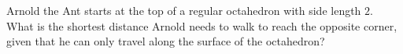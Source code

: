 Arnold the Ant starts at the top of a regular octahedron with side length $2$. What is the shortest distance Arnold needs to walk to reach the opposite corner, given that he can only travel along the surface of the octahedron?
